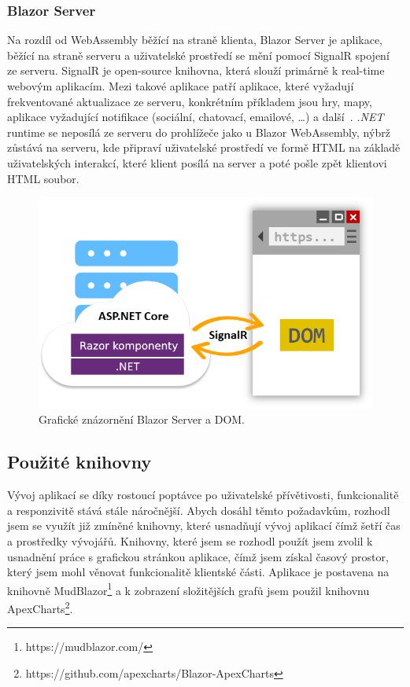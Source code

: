     \subsubsection*{Blazor Server}
    Na rozdíl od WebAssembly běžící na straně klienta, Blazor Server je aplikace, běžící na straně serveru a uživatelské prostředí se mění pomocí SignalR spojení~\cite{MicrosoftBlazor} ze serveru. SignalR je open-source knihovna, která slouží primárně k real-time webovým aplikacím. Mezi takové aplikace patří aplikace, které vyžadují frekventované aktualizace ze serveru, konkrétním příkladem jsou hry, mapy, aplikace vyžadující notifikace (sociální, chatovací, emailové, …) a další~\cite{MicrosoftSignalR}. \textit{.NET} runtime se neposílá ze serveru do prohlížeče jako u Blazor WebAssembly, nýbrž zůstává na serveru, kde připraví uživatelské prostředí ve formě HTML na základě uživatelských interakcí, které klient posílá na server a poté pošle zpět klientovi HTML soubor.
    \begin{figure}[H]
        \centering
        \includegraphics[scale=0.3]{obrazky-figures/PouziteTechnologie/BlazorServer.png}
        \caption{Grafické znázornění Blazor Server a DOM\footnotemark.}
        \label{fig:my_label}
    \end{figure}
    
    \subsection{Použité knihovny}
    \label{sec:UsedLibraries}
    Vývoj aplikací se díky rostoucí poptávce po uživatelské přívětivosti, funkcionalitě a responzivitě stává stále náročnější. Abych dosáhl těmto požadavkům, rozhodl jsem se využít již zmíněné knihovny, které usnadňují vývoj aplikací čímž šetří čas a prostředky vývojářů. Knihovny, které jsem se rozhodl použít jsem zvolil k usnadnění práce s grafickou stránkou aplikace, čímž jsem získal časový prostor, který jsem mohl věnovat funkcionalitě klientské části. Aplikace je postavena na knihovně MudBlazor\footnote{https://mudblazor.com/} a k zobrazení složitějších grafů jsem použil knihovnu ApexCharts\footnote{https://github.com/apexcharts/Blazor-ApexCharts}.
    
